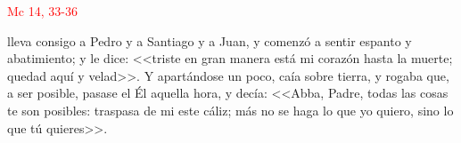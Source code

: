 \hfill\textcolor{red}{Mc 14, 33-36}

lleva consigo a Pedro y a Santiago y a Juan, y comenzó a sentir espanto y abatimiento; y le dice: <<triste en gran manera está mi corazón hasta la muerte;
quedad aquí y velad>>. Y apartándose un poco, caía sobre tierra, y rogaba que, a ser posible, pasase el Él aquella hora, y decía: <<Abba, Padre, todas las cosas te son posibles:
traspasa de mi este cáliz; más no se haga lo que yo quiero, sino lo que tú quieres>>.